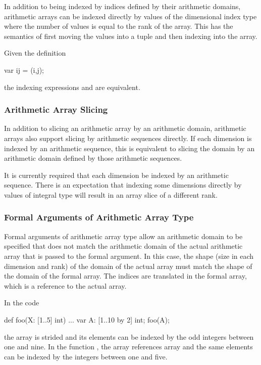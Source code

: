 In addition to being indexed by indices defined by their arithmetic
domains, arithmetic arrays can be indexed directly by values of the
dimensional index type where the number of values is equal to the rank
of the array.  This has the semantics of first moving the values into
a tuple and then indexing into the array.

\begin{example}
Given the definition
\begin{chapel}
  var ij = (i,j);
\end{chapel}
the indexing expressions  and  are
equivalent.
\end{example}

\subsubsection{Arithmetic Array Slicing}
\label{Arithmetic_Array_Slicing}

In addition to slicing an arithmetic array by an arithmetic domain,
arithmetic arrays also support slicing by arithmetic sequences
directly.  If each dimension is indexed by an arithmetic sequence,
this is equivalent to slicing the domain by an arithmetic domain
defined by those arithmetic sequences.

\begin{implementation}
It is currently required that each dimension be indexed by an
arithmetic sequence.  There is an expectation that indexing some
dimensions directly by values of integral type will result in an array
slice of a different rank.
\end{implementation}

\subsubsection{Formal Arguments of Arithmetic Array Type}
\label{Formal_Arguments_of_Arithmetic_Array_Type}

Formal arguments of arithmetic array type allow an arithmetic domain
to be specified that does not match the arithmetic domain of the
actual arithmetic array that is passed to the formal argument.  In
this case, the shape (size in each dimension and rank) of the domain
of the actual array must match the shape of the domain of the formal
array.  The indices are translated in the formal array, which is a
reference to the actual array.

\begin{example}
In the code
\begin{chapel}
def foo(X: [1..5] int) { ... }
var A: [1..10 by 2] int;
foo(A);
\end{chapel}
the array  is strided and its elements can be indexed by the
odd integers between one and nine.  In the function , the
array  references array  and the same elements can be
indexed by the integers between one and five.
\end{example}


